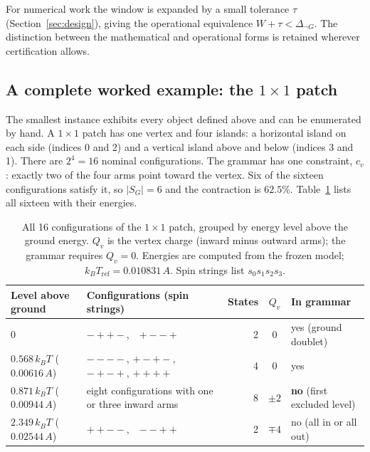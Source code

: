 \documentclass[11pt,a4paper]{article}
\theoremstyle{plain}
\theoremstyle{definition}
\theoremstyle{remark}
\newcommand{\SG}{S_{G}}
\newcommand{\dnG}{\Delta_{\neg G}}
\newcommand{\kBT}{k_{B}T}
\begin{document}
For numerical work the window is expanded by a small tolerance $\tau$ (Section~\ref{sec:design}), giving the operational equivalence $W+\tau<\dnG$. The distinction between the mathematical and operational forms is retained wherever certification allows.

\subsection{A complete worked example: the $1\times1$ patch}\label{sec:oneByOne}
The smallest instance exhibits every object defined above and can be enumerated by hand. A $1\times1$ patch has one vertex and four islands: a horizontal island on each side (indices 0 and 2) and a vertical island above and below (indices 3 and 1). There are $2^4=16$ nominal configurations. The grammar has one constraint, $c_v$: exactly two of the four arms point toward the vertex. Six of the sixteen configurations satisfy it, so $|\SG|=6$ and the contraction is $62.5\%$. Table~\ref{tab:oneByOne} lists all sixteen with their energies.

\begin{table}[t]
\centering\small
\caption{All 16 configurations of the $1\times1$ patch, grouped by energy level above the ground energy. $Q_v$ is the vertex charge (inward minus outward arms); the grammar requires $Q_v=0$. Energies are computed from the frozen model; $\kBT_{\mathrm{ref}}=0.010831\,A$. Spin strings list $s_0s_1s_2s_3$.}
\label{tab:oneByOne}
\begin{tabular}{@{}p{2.9cm}p{4.4cm}rcp{3.0cm}@{}}
\toprule
Level above ground & Configurations (spin strings) & States & $Q_v$ & In grammar\\
\midrule
$0$ & $-{+}{+}-$,\ \ ${+}{-}{-}{+}$ & 2 & 0 & yes (ground doublet)\\
$0.568\,\kBT$ ($0.00616\,A$) & $----$, ${+}{-}{+}{-}$, ${-}{+}{-}{+}$, $++++$ & 4 & 0 & yes\\
$0.871\,\kBT$ ($0.00944\,A$) & eight configurations with one or three inward arms & 8 & $\pm2$ & \textbf{no} (first excluded level)\\
$2.349\,\kBT$ ($0.02544\,A$) & ${+}{+}{-}{-}$,\ \ $--{+}{+}$ & 2 & $\mp4$ & no (all in or all out)\\
\bottomrule
\end{tabular}
\end{table}
\end{document}

